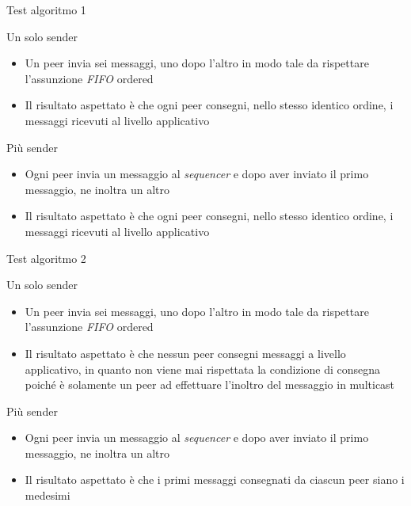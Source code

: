 \documentclass[
	usepdftitle=false,
	xcolor={table, dvipsnames},
	hyperref={
		pdftitle={Multicast totalmente e causalmente ordinato in Go},
    	pdfauthor={A. Chillotti}
    }
]{beamer}
\begin{document}
\begin{frame}{Test algoritmo 1}

\begin{block}{Un solo sender}
\begin{itemize}
\item Un peer invia sei messaggi, uno dopo l'altro in modo tale da rispettare l'assunzione \textit{FIFO} ordered
\item Il risultato aspettato è che ogni peer consegni, nello stesso identico ordine, i messaggi ricevuti al livello applicativo
\end{itemize}

\end{block}

\begin{block}{Più sender}
\begin{itemize}
\item Ogni peer invia un messaggio al \textit{sequencer} e dopo aver inviato il primo messaggio, ne inoltra un altro
\item Il risultato aspettato è che ogni peer consegni, nello stesso identico ordine, i messaggi ricevuti al livello applicativo
\end{itemize}
\end{block}

\end{frame}

\begin{frame}{Test algoritmo 2}

\begin{block}{Un solo sender}
\begin{itemize}
\item Un peer invia sei messaggi, uno dopo l'altro in modo tale da rispettare l'assunzione \textit{FIFO} ordered
\item Il risultato aspettato è che nessun peer consegni messaggi a livello applicativo, in quanto non viene mai rispettata la condizione di consegna poiché è solamente un peer ad effettuare l'inoltro del messaggio in multicast
\end{itemize}
\end{block}

\begin{block}{Più sender}
\begin{itemize}
\item Ogni peer invia un messaggio al \textit{sequencer} e dopo aver inviato il primo messaggio, ne inoltra un altro
\item Il risultato aspettato è che i primi messaggi consegnati da ciascun peer siano i medesimi
\end{itemize}
\end{block}

\end{frame}
\end{document}
